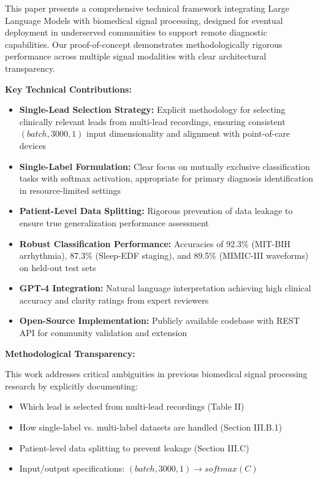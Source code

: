 \documentclass[conference]{IEEEtran}
\begin{document}
This paper presents a comprehensive technical framework integrating Large Language Models with biomedical signal processing, designed for eventual deployment in underserved communities to support remote diagnostic capabilities. Our proof-of-concept demonstrates methodologically rigorous performance across multiple signal modalities with clear architectural transparency.

\textbf{Key Technical Contributions:}
\begin{itemize}
\item \textbf{Single-Lead Selection Strategy:} Explicit methodology for selecting clinically relevant leads from multi-lead recordings, ensuring consistent $(batch, 3000, 1)$ input dimensionality and alignment with point-of-care devices
\item \textbf{Single-Label Formulation:} Clear focus on mutually exclusive classification tasks with softmax activation, appropriate for primary diagnosis identification in resource-limited settings
\item \textbf{Patient-Level Data Splitting:} Rigorous prevention of data leakage to ensure true generalization performance assessment
\item \textbf{Robust Classification Performance:} Accuracies of 92.3\% (MIT-BIH arrhythmia), 87.3\% (Sleep-EDF staging), and 89.5\% (MIMIC-III waveforms) on held-out test sets
\item \textbf{GPT-4 Integration:} Natural language interpretation achieving high clinical accuracy and clarity ratings from expert reviewers
\item \textbf{Open-Source Implementation:} Publicly available codebase with REST API for community validation and extension
\end{itemize}

\textbf{Methodological Transparency:}

This work addresses critical ambiguities in previous biomedical signal processing research by explicitly documenting:
\begin{itemize}
\item Which lead is selected from multi-lead recordings (Table II)
\item How single-label vs. multi-label datasets are handled (Section III.B.1)
\item Patient-level data splitting to prevent leakage (Section III.C)
\item Input/output specifications: $(batch, 3000, 1) \rightarrow softmax(C)$
\end{itemize}
\end{document}
